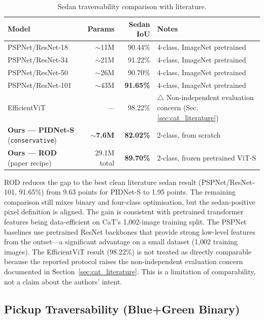 \documentclass[12pt,a4paper]{report}
\begin{document}
\begin{table}[H]
\centering
\caption{Sedan traversability comparison with literature.}
\label{tab:sedan_comparison}
\small
\begin{tabular}{@{}lrrl@{}}
\toprule
\textbf{Model} & \textbf{Params} & \textbf{Sedan IoU} & \textbf{Notes} \\
\midrule
PSPNet/ResNet-18~\cite{sharma2022cat}  & ${\sim}$11M & 90.44\% & 4-class, ImageNet pretrained \\
PSPNet/ResNet-34~\cite{sharma2022cat}  & ${\sim}$21M & 91.22\% & 4-class, ImageNet pretrained \\
PSPNet/ResNet-50~\cite{sharma2022cat}  & ${\sim}$26M & 90.70\% & 4-class, ImageNet pretrained \\
PSPNet/ResNet-101~\cite{sharma2022cat} & ${\sim}$43M & \textbf{91.65\%} & 4-class, ImageNet pretrained \\
EfficientViT~\cite{efficientvit_offroad} & --- & 98.22\% & \textcolor{warn}{$\triangle$ Non-independent evaluation concern (Sec. \ref{sec:cat_literature})} \\
\midrule
\textbf{Ours --- PIDNet-S} (\texttt{conservative}) & \textbf{${\sim}$7.6M} & \textbf{82.02\%} & 2-class, from scratch \\
\textbf{Ours --- ROD} (paper recipe) & 29.1M total & \textbf{89.70\%} & 2-class, frozen pretrained ViT-S \\
\bottomrule
\end{tabular}
\end{table}

ROD reduces the gap to the best clean literature sedan result
(PSPNet/ResNet-101, 91.65\%) from 9.63 points for PIDNet-S to 1.95 points.
The remaining comparison still mixes binary and four-class optimisation, but
the sedan-positive pixel definition is aligned. The gain is consistent with
pretrained transformer features being data-efficient on CaT's 1{,}002-image
training split.
The PSPNet baselines use pretrained ResNet backbones that provide strong low-level features from the outset---a significant advantage on a small dataset (1{,}002 training images).
The EfficientViT result (98.22\%) is not treated as directly comparable because the
reported protocol raises the non-independent evaluation concern documented in
Section~\ref{sec:cat_literature}. This is a limitation of comparability, not a
claim about the authors' intent.

\subsection{Pickup Traversability (Blue+Green Binary)}
\end{document}
